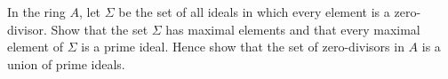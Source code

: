 In the ring $A$, let $\Sigma$ be the set of all ideals in which every element
is a zero-divisor. Show that the set $\Sigma$ has maximal elements and that every
maximal element of $\Sigma$ is a prime ideal. Hence show that the set of zero-divisors
in $A$ is a union of prime ideals.
